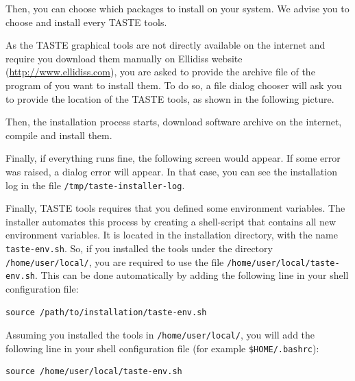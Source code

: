 \documentclass[11pt]{book}
\begin{document}
     Then, you can choose which packages to install on your system. We advise
     you to choose and install every TASTE tools.

     \centerline{}

     As the TASTE graphical tools are not directly available on the internet and
     require you download them manually on Ellidiss website
     (\url{http://www.ellidiss.com}), you are asked to provide the archive file
     of the program of you want to install them. To do so, a file dialog chooser
     will ask you to provide the location of the TASTE tools, as shown in the
     following picture.

     \centerline{}

     Then, the installation process starts, download software archive on the
     internet, compile and install them.

     \centerline{}

     Finally, if everything runs fine, the following screen would appear. If
     some error was raised, a dialog error will appear. In that case, you can
     see the installation log in the file \texttt{/tmp/taste-installer-log}.

     \centerline{}

     Finally, TASTE tools requires that you defined some environment variables.
     The installer automates this process by creating a shell-script that
     contains all new environment variables. It is located in the installation
     directory, with the name \texttt{taste-env.sh}. So, if you installed the
     tools under the directory \texttt{/home/user/local/}, you are required to
     use the file \texttt{/home/user/local/taste-env.sh}. This can be done
     automatically by adding the following line in your shell configuration
     file:
     \begin{verbatim}
source /path/to/installation/taste-env.sh
     \end{verbatim}

     Assuming you installed the tools in \texttt{/home/user/local/}, you will
     add the following line in your shell configuration file (for example
     \texttt{\$HOME/.bashrc}):
     \begin{verbatim}
source /home/user/local/taste-env.sh
     \end{verbatim}
\end{document}
